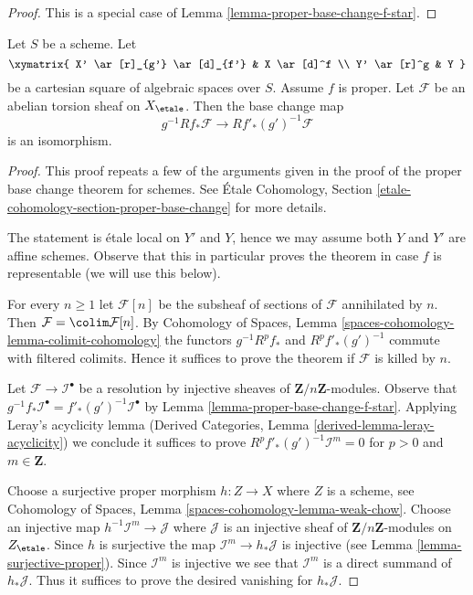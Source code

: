 \begin{proof}
This is a special case of Lemma \ref{lemma-proper-base-change-f-star}.
\end{proof}

\begin{theorem}
\label{theorem-proper-base-change}
Let $S$ be a scheme. Let
$$
\xymatrix{
X' \ar[r]_{g'} \ar[d]_{f'} & X \ar[d]^f \\
Y' \ar[r]^g & Y
}
$$
be a cartesian square of algebraic spaces over $S$.
Assume $f$ is proper.
Let $\mathcal{F}$ be an abelian torsion sheaf on $X_\etale$.
Then the base change map
$$
g^{-1}Rf_*\mathcal{F} \longrightarrow Rf'_*(g')^{-1}\mathcal{F}
$$
is an isomorphism.
\end{theorem}

\begin{proof}
This proof repeats a few of the arguments given in the proof of the
proper base change theorem for schemes. See
\'Etale Cohomology, Section \ref{etale-cohomology-section-proper-base-change}
for more details.

\medskip\noindent
The statement is \'etale local on $Y'$ and $Y$, hence we may assume
both $Y$ and $Y'$ are affine schemes. Observe that this in particular
proves the theorem in case $f$ is representable (we will use this
below).

\medskip\noindent
For every $n \geq 1$ let $\mathcal{F}[n]$ be the subsheaf of sections
of $\mathcal{F}$ annihilated by $n$. Then
$\mathcal{F} = \colim \mathcal{F}[n]$. By 
Cohomology of Spaces, Lemma \ref{spaces-cohomology-lemma-colimit-cohomology}
the functors $g^{-1}R^pf_*$ and $R^pf'_*(g')^{-1}$ commute
with filtered colimits. Hence it suffices to prove the theorem
if $\mathcal{F}$ is killed by $n$.

\medskip\noindent
Let $\mathcal{F} \to \mathcal{I}^\bullet$ be a resolution by
injective sheaves of $\mathbf{Z}/n\mathbf{Z}$-modules.
Observe that
$g^{-1}f_*\mathcal{I}^\bullet = f'_*(g')^{-1}\mathcal{I}^\bullet$
by Lemma \ref{lemma-proper-base-change-f-star}.
Applying Leray's acyclicity lemma
(Derived Categories, Lemma \ref{derived-lemma-leray-acyclicity})
we conclude it suffices to prove
$R^pf'_*(g')^{-1}\mathcal{I}^m = 0$ for $p > 0$ and $m \in \mathbf{Z}$.

\medskip\noindent
Choose a surjective proper morphism
$h : Z \to X$ where $Z$ is a scheme, see
Cohomology of Spaces, Lemma \ref{spaces-cohomology-lemma-weak-chow}.
Choose an injective map $h^{-1}\mathcal{I}^m \to \mathcal{J}$
where $\mathcal{J}$ is an injective sheaf of
$\mathbf{Z}/n\mathbf{Z}$-modules on $Z_\etale$.
Since $h$ is surjective the map $\mathcal{I}^m \to h_*\mathcal{J}$
is injective (see Lemma \ref{lemma-surjective-proper}).
Since $\mathcal{I}^m$ is injective we see that $\mathcal{I}^m$
is a direct summand of $h_*\mathcal{J}$. Thus it suffices
to prove the desired vanishing for $h_*\mathcal{J}$.


\end{proof}
